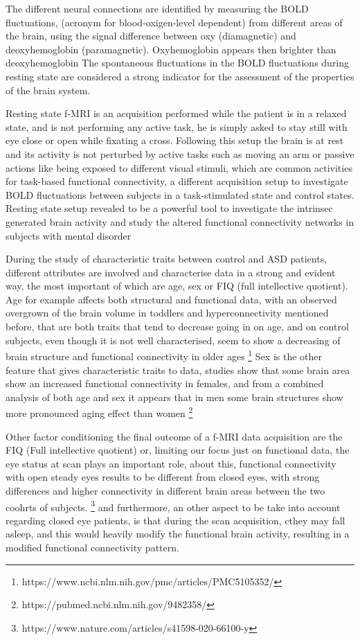 \documentclass[a4paper,11pt]{article}
\begin{document}
The different neural connections are identified by measuring the BOLD fluctuations, (acronym for blood-oxigen-level dependent) from different areas of the brain, using the signal difference between oxy (diamagnetic) and deoxyhemoglobin (paramagnetic).
Oxyhemoglobin appears then brighter than deoxyhemoglobin
The spontaneous fluctuations in the BOLD fluctuations during resting state are considered a strong indicator for the assessment of the properties of the brain system.

Resting state f-MRI is an acquisition performed while the patient is in a relaxed state, and is not performing any active task, he is simply asked to stay still with eye close or open while fixating a cross.
Following this setup the brain is at rest and its activity is not perturbed by active tasks such as moving an arm or passive actions like being exposed to different visual stimuli, which are common activities for task-based functional connectivity, a different acquisition setup to investigate BOLD fluctuations between subjects in a task-stimulated state and control states.
Resting state setup revealed to be a powerful tool to investigate the intrinsec generated brain activity and study the altered functional connectivity networks in subjects with mental disorder


During the study of characteristic traits between control and ASD patients, different attributes are involved and characterise data in a strong and evident way, the most important of which are age, sex or FIQ (full intellective quotient).
Age for example affects both structural and functional data, with an observed overgrown of the brain volume in toddlers and hyperconnectivity mentioned before, that are both traits that tend to decrease going in on age, and on control subjects, even though it is not well characterised, seem to show a decreasing of brain structure and functional connectivity in older ages
\footnote{https://www.ncbi.nlm.nih.gov/pmc/articles/PMC5105352/}
Sex is the other feature that gives characteristic traits to data, studies show that some brain area show an increased functional connectivity in females, and from a combined analysis of both age and sex it appears that in men some brain structures show more pronounced aging effect than women
\footnote{https://pubmed.ncbi.nlm.nih.gov/9482358/}

Other factor conditioning the final outcome of a f-MRI data acquisition are the FIQ (Full intellective quotient) or, limiting our focus just on functional data, the eye status at scan plays an important role, about this, functional connectivity with open steady eyes results to be different from closed eyes, with strong differences and higher connectivity in different brain areas between the two coohrts of subjects.
\footnote{https://www.nature.com/articles/s41598-020-66100-y}
and furthermore, an other aspect to be take into account regarding closed eye patients, is that during the scan acquisition, cthey may fall asleep, and this would heavily modify the functional brain activity, resulting in a modified functional connectivity pattern.
\end{document}
